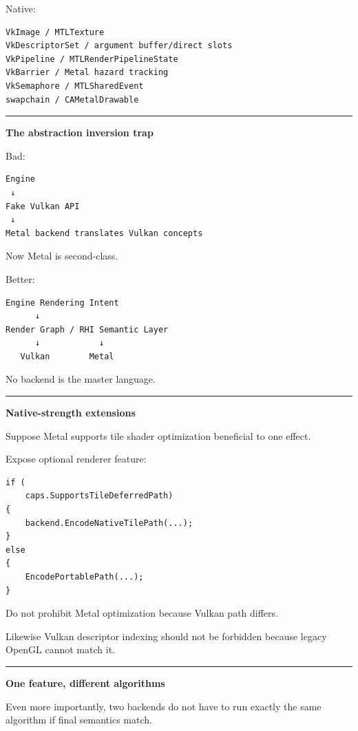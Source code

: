 Native:

\begin{verbatim}
VkImage / MTLTexture
VkDescriptorSet / argument buffer/direct slots
VkPipeline / MTLRenderPipelineState
VkBarrier / Metal hazard tracking
VkSemaphore / MTLSharedEvent
swapchain / CAMetalDrawable
\end{verbatim}

\begin{center}\rule{0.5\linewidth}{0.5pt}\end{center}

\textbf{The abstraction inversion trap}

Bad:

\begin{verbatim}
Engine
 ↓
Fake Vulkan API
 ↓
Metal backend translates Vulkan concepts
\end{verbatim}

Now Metal is second-class.

Better:

\begin{verbatim}
Engine Rendering Intent
      ↓
Render Graph / RHI Semantic Layer
      ↓            ↓
   Vulkan        Metal
\end{verbatim}

No backend is the master language.

\begin{center}\rule{0.5\linewidth}{0.5pt}\end{center}

\textbf{Native-strength extensions}

Suppose Metal supports tile shader optimization beneficial to one effect.

Expose optional renderer feature:

\begin{verbatim}
if (
    caps.SupportsTileDeferredPath)
{
    backend.EncodeNativeTilePath(...);
}
else
{
    EncodePortablePath(...);
}
\end{verbatim}

Do not prohibit Metal optimization because Vulkan path differs.

Likewise Vulkan descriptor indexing should not be forbidden because legacy OpenGL cannot match it.

\begin{center}\rule{0.5\linewidth}{0.5pt}\end{center}

\textbf{One feature, different algorithms}

Even more importantly, two backends do not have to run exactly the same algorithm if final semantics match.

